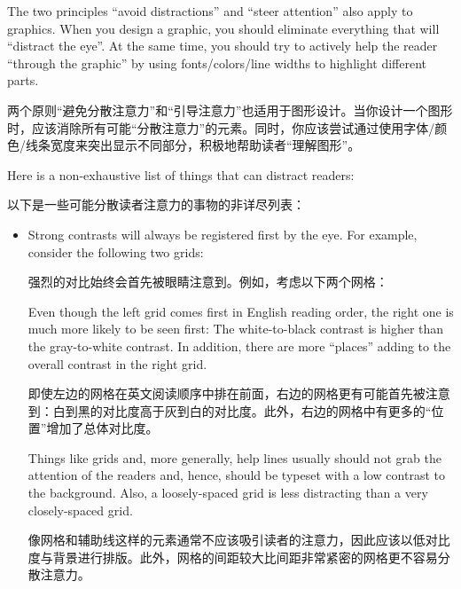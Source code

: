 The two principles ``avoid distractions'' and ``steer attention'' also apply to
graphics. When you design a graphic, you should eliminate everything that will
``distract the eye''. At the same time, you should try to actively help the
reader ``through the graphic'' by using fonts/colors/line widths to highlight
different parts.


两个原则“避免分散注意力”和“引导注意力”也适用于图形设计。当你设计一个图形时，应该消除所有可能“分散注意力”的元素。同时，你应该尝试通过使用字体/颜色/线条宽度来突出显示不同部分，积极地帮助读者“理解图形”。


Here is a non-exhaustive list of things that can distract readers:

以下是一些可能分散读者注意力的事物的非详尽列表：
%
\begin{itemize}
    \item Strong contrasts will always be registered first by the eye. For
        example, consider the following two grids:

        强烈的对比始终会首先被眼睛注意到。例如，考虑以下两个网格：

        \medskip\par

        \medskip
        Even though the left grid comes first in English reading order, the
        right one is much more likely to be seen first: The white-to-black
        contrast is higher than the gray-to-white contrast. In addition,
        there are more ``places'' adding to the overall contrast in the right
        grid.

        即使左边的网格在英文阅读顺序中排在前面，右边的网格更有可能首先被注意到：白到黑的对比度高于灰到白的对比度。此外，右边的网格中有更多的“位置”增加了总体对比度。

        Things like grids and, more generally, help lines usually should not
        grab the attention of the readers and, hence, should be typeset with
        a low contrast to the background. Also, a loosely-spaced grid is less
        distracting than a very closely-spaced grid.

        像网格和辅助线这样的元素通常不应该吸引读者的注意力，因此应该以低对比度与背景进行排版。此外，网格的间距较大比间距非常紧密的网格更不容易分散注意力。


\end{itemize}
